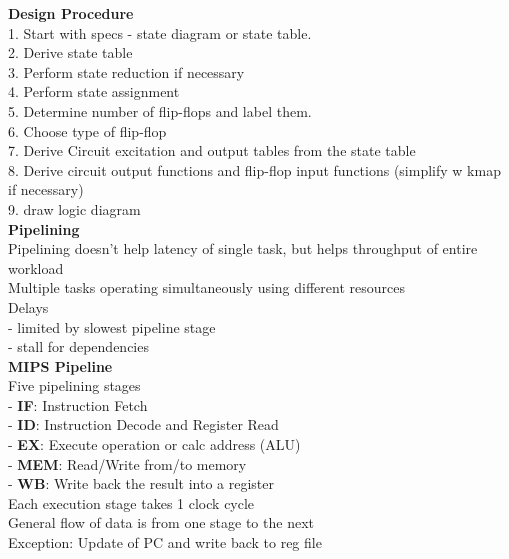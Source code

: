 \documentclass[10pt, a4paper]{article}
\newcommand{\highlight}[1]{{\color{red}\textbf{#1}}}
\begin{document}
\begin{multicols*}{3}
		\textbf{Design Procedure}\\
		1. Start with specs - state diagram or state table.\\
		2. Derive state table\\
		3. Perform state reduction if necessary\\
		4. Perform state assignment\\
		5. Determine number of flip-flops and label them.\\
		6. Choose type of flip-flop\\
		7. Derive Circuit excitation and output tables from the state table\\
		8. Derive circuit output functions and flip-flop input functions (simplify w kmap if necessary)\\
		9. draw logic diagram\\
		
		{\normalsize\textbf{Pipelining}}\\
		Pipelining doesn't help latency of single task, but helps throughput of entire workload\\
		Multiple tasks operating simultaneously using different resources\\
		Delays\\
		- limited by slowest pipeline stage\\
		- stall for dependencies\\
		
		\textbf{MIPS Pipeline}\\
		Five pipelining stages\\
		- \highlight{IF}: Instruction Fetch\\
		- \highlight{ID}: Instruction Decode and Register Read\\
		- \highlight{EX}: Execute operation or calc address (ALU)\\
		- \highlight{MEM}: Read/Write from/to memory\\
		- \highlight{WB}: Write back the result into a register\\
		
		Each execution stage takes 1 clock cycle\\
		General flow of data is from one stage to the next\\
		
		Exception: Update of PC and write back to reg file\\
		

\end{multicols*}
\end{document}
